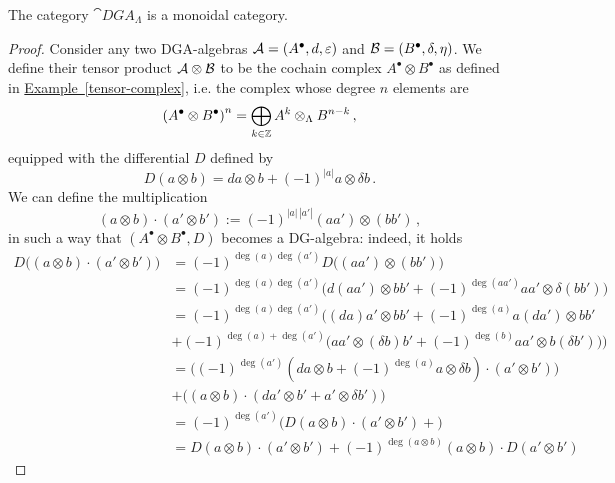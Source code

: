 	\begin{prop}
		The category $\cat{DGA}_{\Lambda}$ is a %
		monoidal category.
		\begin{proof}
			Consider any two DGA-algebras $\mathcal{A} = (A^{\bullet},d,\varepsilon)$
			and $\mathcal{B} = (B^{\bullet}, \delta, \eta)$.
			We define their tensor product $\mathcal{A} \otimes \mathcal{B}$
			to be the cochain complex $A^{\bullet} \otimes B^{\bullet}$
			as defined in \hyperref[tensor-complex]{Example~\ref{tensor-complex}},
			i.e. the complex whose degree $n$ elements are
			\begin{equation*}
				\left( A^{\bullet} \otimes B^{\bullet} \right)^{n}
				= \bigoplus_{k \in {\mathbb Z}} A^{k} \otimes_{\Lambda} B^{n-k}\,,
			\end{equation*}
			equipped with the differential $D$ defined by
			\begin{equation*}
				D(a \otimes b) = da \otimes b + (-1)^{|a|}a \otimes \delta b\,.
			\end{equation*}
			We can define the multiplication
			\begin{equation*}
				(a \otimes b) \cdot (a' \otimes b')
				:= (-1)^{|a|\,|a'|}(aa') \otimes (bb')\,,
			\end{equation*}
			in such a way that $(A^{\bullet} \otimes B^{\bullet},D)$
			becomes a DG-algebra: indeed, it holds
			\begin{align*}
				D\big((a \otimes b) \cdot (a' \otimes b')\big)
				&= (-1)^{\deg(a)\deg(a')} D\big( (aa') \otimes (bb') ) \\
				&= (-1)^{\deg(a)\deg(a')} \big( d(aa') \otimes bb'
				+ (-1)^{\deg(aa')} aa' \otimes \delta(bb') \big) \\
				&= (-1)^{\deg(a)\deg(a')} 
				\Big( (da)a' \otimes bb' + (-1)^{\deg(a)}a(da') \otimes bb' \\
				&+ (-1)^{\deg(a) + \deg(a')} 
				\big(aa' \otimes (\delta b)b' 
				+ (-1)^{\deg(b)} aa' \otimes b(\delta b')\big)\Big) \\
				&= 
				\big( (-1)^{\deg(a')} ( da \otimes b %
				+ (-1)^{\deg(a)} a \otimes \delta b) \cdot (a' \otimes b') \big) \\
				&+ \big((a \otimes b) \cdot (da' \otimes b' + a' \otimes \delta b' )\big) \\
				&= (-1)^{\deg(a')} \big( D(a \otimes b) \cdot (a' \otimes b')
				+ \big)\\
				&= D(a \otimes b) \cdot (a' \otimes b')
				+(-1)^{\deg(a \otimes b)} (a \otimes b) \cdot D(a' \otimes b')
			\end{align*}

\end{proof}
\end{prop}
